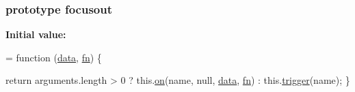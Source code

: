 \subsubsection[{\texorpdfstring{focusout}{focusout}}]{ {\bf prototype} focusout}\hypertarget{jquery-2_82_81-vsdoc_8js_ac5fd3487b99e86d52fbef52f40d31565}{}\label{jquery-2_82_81-vsdoc_8js_ac5fd3487b99e86d52fbef52f40d31565}
{\bfseries Initial value\+:}
\begin{DoxyCode}
= \textcolor{keyword}{function} (\hyperlink{jquery-2_82_81-vsdoc_8js_a609407b3456fdc3c5671a9fc4a226ff7}{data}, \hyperlink{jquery-2_82_81-vsdoc_8js_acef6bdaf6b9b20fdcca1ea86f0902c3b}{fn}) \{
        

        \textcolor{keywordflow}{return} arguments.length > 0 ?
            this.\hyperlink{jquery-2_82_81-vsdoc_8js_ae453b412b883f60220d73468ef6c6dbc}{on}(name, null, \hyperlink{jquery-2_82_81-vsdoc_8js_a609407b3456fdc3c5671a9fc4a226ff7}{data}, \hyperlink{jquery-2_82_81-vsdoc_8js_acef6bdaf6b9b20fdcca1ea86f0902c3b}{fn}) :
            this.\hyperlink{jquery-2_82_81-vsdoc_8js_a2388c4114d5e3e4eab020f973641519c}{trigger}(name);
    \}
\end{DoxyCode}
